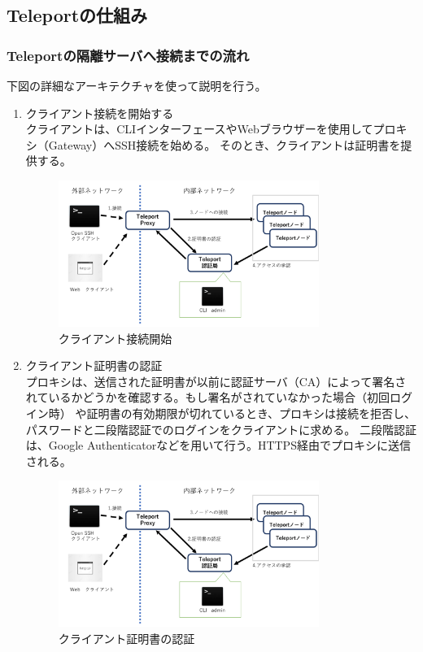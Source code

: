 \documentclass[11pt,a4j,titlepage]{jreport}
\begin{document}
\subsection*{Teleportの仕組み}
\subsubsection*{Teleportの隔離サーバへ接続までの流れ}
下図の詳細なアーキテクチャを使って説明を行う。

\begin{enumerate}[1:]
    \setlength{\parskip}{0.1cm} %
    \setlength{\itemsep}{0.1cm}

    \item クライアント接続を開始する\mbox{}\\クライアントは、CLIインターフェースやWebブラウザーを使用してプロキシ（Gateway）へSSH接続を始める。
    そのとき、クライアントは証明書を提供する。\\
    \begin{figure}[H]
        \centering
        \includegraphics*[width=0.8\textwidth,page=2]{graphs/teleport_archtecture.pdf}
        \caption{クライアント接続開始}
        \label{teleport_connect}
    \end{figure}


    \item クライアント証明書の認証\mbox{}\\
    プロキシは、送信された証明書が以前に認証サーバ（CA）によって署名されているかどうかを確認する。もし署名がされていなかった場合（初回ログイン時）
    や証明書の有効期限が切れているとき、プロキシは接続を拒否し、パスワードと二段階認証でのログインをクライアントに求める。
    二段階認証は、Google Authenticatorなどを用いて行う。HTTPS経由でプロキシに送信される。
    \begin{figure}[H]
        \centering
        \includegraphics*[width=0.8\textwidth,page=3]{graphs/teleport_archtecture.pdf}
        \caption{クライアント証明書の認証}
        \label{teleport_certificate}
    \end{figure}


\end{enumerate}
\end{document}
